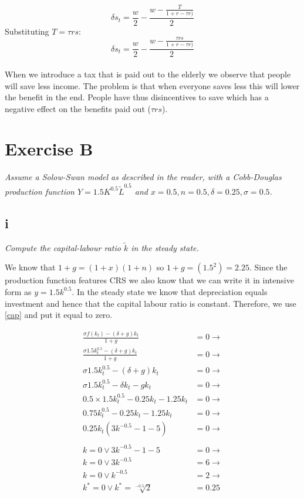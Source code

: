 \documentclass[11pt,a4paper]{article}
\begin{document}
\begin{equation}
\delta s_t = \frac{w}{2} - \frac{w-\frac{T}{1+r-\tau r)}}{2}
\end{equation}
Substituting $T=\tau r s$:
\begin{equation}
\delta s_t = \frac{w}{2} - \frac{w-\frac{\tau r s}{1+r-\tau r)}}{2}
\end{equation} \\
When we introduce a tax that is paid out to the elderly we observe that people will save less income. The problem is that when everyone saves less this will lower the benefit in the end. People have thus disincentives to save which has a negative effect on the benefits paid out ($\tau r s$). 

    \section{Exercise B}
\textit{Assume a Solow-Swan model as described in the reader, with a Cobb-Douglas
production function $Y =1.5K^{0.5} \tilde{L}^{0.5}$ and $x = 0.5, n = 0.5, \delta = 0.25, \sigma = 0.5$.}
        \subsection{i} 
\textit{Compute the capital-labour ratio $\tilde{k}$ in the steady state.}

We know that $1+g=(1+x)(1+n)$ so $1+g=(1.5^2)=2.25$. Since the production function features CRS we also know that we can write it in intensive form as $y=1.5k^{0.5}$. In the steady state we know that depreciation equals investment and hence that the capital labour ratio is constant. Therefore, we use \eqref{cap} and put it equal to zero.


\begin{align*}
\frac{\sigma f(k_t) -(\delta+g)k_t}{1+g} &= 0 \rightarrow \\
\frac{\sigma 1.5k_t^{0.5} -(\delta+g)k_t}{1+g} &= 0 \rightarrow \\
\sigma 1.5k_t^{0.5} -(\delta+g)k_t &= 0 \rightarrow \\
\sigma 1.5k_t^{0.5} -\delta k_t - g k_t &= 0 \rightarrow \\
0.5 \times 1.5k_t^{0.5} -0.25k_t - 1.25k_t &= 0 \rightarrow \\
0.75k_t^{0.5} -0.25k_t - 1.25k_t &= 0 \rightarrow \\
0.25k_t(3k^{-0.5}-1-5)&=0 \rightarrow \\ \\
k=0 \vee 3k^{-0.5}-1-5&=0 \rightarrow \\
k=0 \vee 3k^{-0.5}&=6 \rightarrow \\
k=0 \vee k^{-0.5}&=2 \rightarrow \\
k^*=0 \vee k^*=\sqrt[-0.5]2&=0.25
\end{align*}
\end{document}
